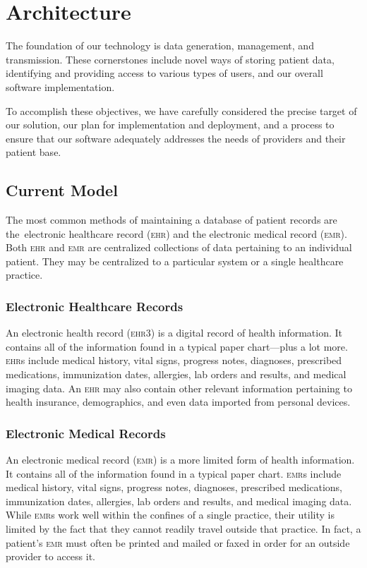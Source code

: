 
\section{Architecture}
The foundation of our technology is data generation, management, and transmission. These cornerstones include novel ways of storing patient data, identifying and providing access to various types of users, and our overall software implementation.%

To accomplish these objectives, we have carefully considered the precise target of our solution, our plan for implementation and deployment, and a process to ensure that our software adequately addresses the needs of providers and their patient base.%

\subsection{Current Model}
The most common methods of maintaining a database of patient records are the electronic healthcare record (\textsc{ehr}) and the electronic medical record (\textsc{emr}). Both \textsc{ehr} and \textsc{emr} are centralized collections of data pertaining to an individual patient. They may be centralized to a particular system or a single healthcare practice.%

  \subsubsection{Electronic Healthcare Records}
  An electronic health record (\textsc{ehr3}) is a digital record of health information. It contains all of the information found in a typical paper chart---plus a lot more. \textsc{ehr}s include medical history, vital signs, progress notes, diagnoses, prescribed medications, immunization dates, allergies, lab orders and results, and medical imaging data. An \textsc{ehr} may also contain other relevant information pertaining to health insurance, demographics, and even data imported from personal devices.\cite{EMRvsEHR}%

  \subsubsection{Electronic Medical Records}
  An electronic medical record (\textsc{emr}) is a more limited form of health information. It contains all of the information found in a typical paper chart. \textsc{emr}s include medical history, vital signs, progress notes, diagnoses, prescribed medications, immunization dates, allergies, lab orders and results, and medical imaging data. While \textsc{emr}s work well within the confines of a single practice, their utility is limited by the fact that they cannot readily travel outside that practice. In fact, a patient's \textsc{emr} must often be printed and mailed or faxed in order for an outside provider to access it.\cite{EMRvsEHR}%

